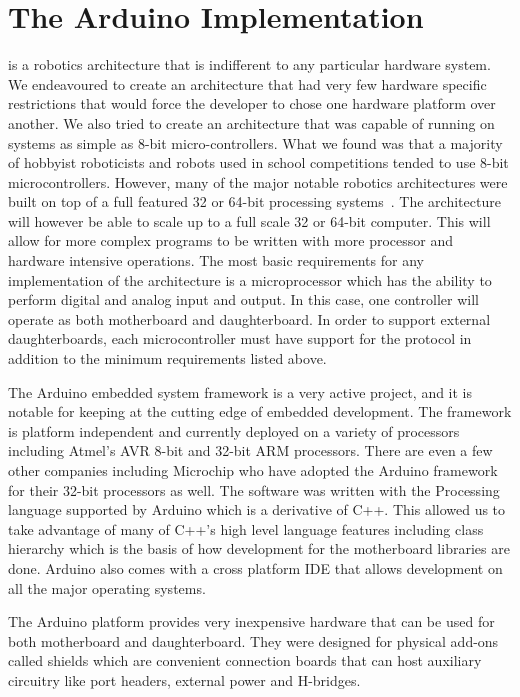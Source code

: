 

\section{The Arduino Implementation} %
\label{sec:the_arduino_implementation}
\xten is a robotics architecture that is indifferent to any particular hardware system. We endeavoured to create an architecture that had very few hardware specific restrictions that would force the developer to chose one hardware platform over another. We also tried to create an architecture that was capable of running on systems as simple as 8-bit micro-controllers. What we found was that a majority of hobbyist roboticists and robots used in school competitions tended to use 8-bit microcontrollers. However, many of the major notable robotics architectures were built on top of a full featured 32 or 64-bit processing systems~\parencite{Elkady2012}. The architecture will however be able to scale up to a full scale 32 or 64-bit computer. This will allow for more complex programs to be written with more processor and hardware intensive operations. The most basic requirements for any implementation of the \xten architecture is a microprocessor which has the ability to perform digital and analog input and output. In this case, one controller will operate as both motherboard and daughterboard. In order to support external daughterboards, each microcontroller must have support for the \iic protocol in addition to the minimum requirements listed above.

The Arduino embedded system framework is a very active project, and it is notable for keeping at the cutting edge of embedded development. The framework is platform independent and currently deployed on a variety of processors including Atmel's AVR 8-bit and 32-bit ARM processors. There are even a few other companies including Microchip who have adopted the Arduino framework for their 32-bit processors as well. 
The \xten software was written with the Processing language supported by Arduino which is a derivative of C++. This allowed us to take advantage of many of C++'s high level language features including class hierarchy which is the basis of how development for the motherboard libraries are done. Arduino also comes with a cross platform IDE that allows development on all the major operating systems.

The Arduino platform provides very inexpensive hardware that can be used for both motherboard and daughterboard. They were designed for physical add-ons called shields which are convenient connection boards that can host auxiliary circuitry like port headers, external power and H-bridges.


